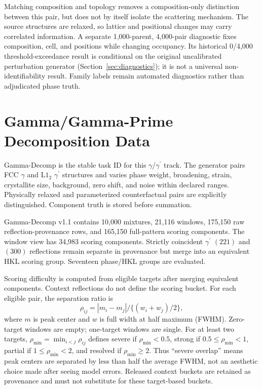 \documentclass[sigconf,review,anonymous]{acmart}
\newcommand{\gphase}{$\gamma$}
\newcommand{\gp}{\ensuremath{\gamma^{\prime}}}
\newcommand{\lone}{$\mathrm{L1_2}$}
\newenvironment{revision}{\ifdefined\markedcopy\color{red!70!black}\else\color{black}\fi}{}
\begin{document}
\begin{revision}
Matching composition and topology removes a composition-only distinction
between this pair, but does not by itself isolate the scattering mechanism.
The source structures are relaxed, so lattice and positional changes may
carry correlated information. A separate 1,000-parent, 4,000-pair diagnostic
fixes composition, cell, and positions while changing occupancy. Its
historical 0/4,000 threshold-exceedance result is conditional on the original
uncalibrated perturbation generator (Section~\ref{sec:diagnostics}); it is
not a universal non-identifiability result. Family labels remain automated
diagnostics rather than adjudicated phase truth.
\end{revision}

\section{Gamma/Gamma-Prime Decomposition Data}

Gamma-Decomp is the stable task ID for this \gphase{}/\gp{} track. The generator
pairs FCC \gphase{} and \lone{} \gp{} structures and varies phase
weight, broadening, strain, crystallite size, background, zero shift, and noise
within declared ranges. Physically relaxed and parameterized counterfactual
pairs are explicitly distinguished. Component truth is stored before summation.

Gamma-Decomp v1.1 contains 10,000 mixtures, 21,116 windows, 175,150 raw
reflection-provenance rows, and 165,150 full-pattern scoring components. The
window view has 34,983 scoring components. Strictly coincident \gp{} $(221)$ and
$(300)$ reflections remain separate in provenance but merge into an equivalent
HKL scoring group. Seventeen phase/HKL groups are evaluated.

\begin{revision}
Scoring difficulty is computed from eligible targets after merging
equivalent components. Context reflections do not define the scoring
bucket. For each eligible pair, the separation ratio is
\[
\rho_{ij}=|m_i-m_j|/\{(w_i+w_j)/2\},
\]
where $m$ is peak center and $w$ is full width at half maximum (FWHM).
Zero-target windows are empty; one-target windows are single. For at least
two targets, $\rho_{\min}=\min_{i<j}\rho_{ij}$ defines severe if
$\rho_{\min}<0.5$, strong if $0.5\le\rho_{\min}<1$, partial if
$1\le\rho_{\min}<2$, and resolved if $\rho_{\min}\ge2$. Thus ``severe
overlap'' means peak centers are separated by less than half the average FWHM,
not an aesthetic choice made after seeing model errors. Released context
buckets are retained as provenance and must not substitute for these
target-based buckets.
\end{revision}
\end{document}

